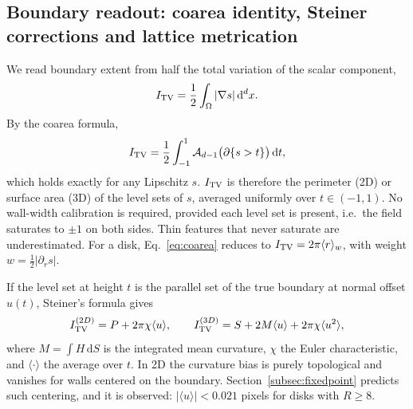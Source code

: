\documentclass[11pt,a4paper]{article}
\newcommand{\dd}{\mathrm{d}}
\begin{document}
\subsection{Boundary readout: coarea identity, Steiner corrections and lattice metrication}\label{subsec:readout}
We read boundary extent from half the total variation of the scalar component,
\begin{equation}
 I_{\rm TV}=\frac12\int_\Omega|\nabla s|\,\dd^dx .
\end{equation}
By the coarea formula,
\begin{equation}
 I_{\rm TV}=\frac12\int_{-1}^{1}\mathcal A_{d-1}\bigl(\partial\{s>t\}\bigr)\,\dd t ,
 \label{eq:coarea}
\end{equation}
which holds exactly for any Lipschitz $s$. $I_{\rm TV}$ is therefore the perimeter (2D) or surface area (3D) of the level sets of $s$, averaged uniformly over $t\in(-1,1)$. No wall-width calibration is required, provided each level set is present, i.e.\ the field saturates to $\pm1$ on both sides. Thin features that never saturate are underestimated. For a disk, Eq.~\eqref{eq:coarea} reduces to $I_{\rm TV}=2\pi\langle r\rangle_w$, with weight $w=\tfrac12|\partial_rs|$.

If the level set at height $t$ is the parallel set of the true boundary at normal offset $u(t)$, Steiner's formula gives
\begin{equation}
 I_{\rm TV}^{(2D)}=P+2\pi\chi\langle u\rangle,\qquad
 I_{\rm TV}^{(3D)}=S+2M\langle u\rangle+2\pi\chi\langle u^2\rangle,
 \label{eq:steiner}
\end{equation}
where $M=\int H\,\dd S$ is the integrated mean curvature, $\chi$ the Euler characteristic, and $\langle\cdot\rangle$ the average over $t$. In 2D the curvature bias is purely topological and vanishes for walls centered on the boundary. Section~\ref{subsec:fixedpoint} predicts such centering, and it is observed: $|\langle u\rangle|<0.021$ pixels for disks with $R\ge8$.
\end{document}
